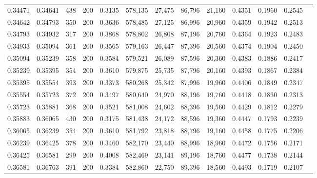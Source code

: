 \begin{tabular}{rrrrrrrrrrrrr}
0.34471 & 0.34641 &   438 & 200 &                                     0.3135 & 578,135 &  27,475 &  86,796 &  21,160 & 0.4351 & 0.1960 & 0.2545 \\
0.34642 & 0.34793 &   350 & 200 &                                     0.3636 & 578,485 &  27,125 &  86,996 &  20,960 & 0.4359 & 0.1942 & 0.2513 \\
0.34793 & 0.34932 &   317 & 200 &                                     0.3868 & 578,802 &  26,808 &  87,196 &  20,760 & 0.4364 & 0.1923 & 0.2483 \\
0.34933 & 0.35094 &   361 & 200 &                                     0.3565 & 579,163 &  26,447 &  87,396 &  20,560 & 0.4374 & 0.1904 & 0.2450 \\
0.35094 & 0.35239 &   358 & 200 &                                     0.3584 & 579,521 &  26,089 &  87,596 &  20,360 & 0.4383 & 0.1886 & 0.2417 \\
0.35239 & 0.35395 &   354 & 200 &                                     0.3610 & 579,875 &  25,735 &  87,796 &  20,160 & 0.4393 & 0.1867 & 0.2384 \\
0.35395 & 0.35554 &   393 & 200 &                                     0.3373 & 580,268 &  25,342 &  87,996 &  19,960 & 0.4406 & 0.1849 & 0.2347 \\
0.35554 & 0.35723 &   372 & 200 &                                     0.3497 & 580,640 &  24,970 &  88,196 &  19,760 & 0.4418 & 0.1830 & 0.2313 \\
0.35723 & 0.35881 &   368 & 200 &                                     0.3521 & 581,008 &  24,602 &  88,396 &  19,560 & 0.4429 & 0.1812 & 0.2279 \\
0.35883 & 0.36065 &   430 & 200 &                                     0.3175 & 581,438 &  24,172 &  88,596 &  19,360 & 0.4447 & 0.1793 & 0.2239 \\
0.36065 & 0.36239 &   354 & 200 &                                     0.3610 & 581,792 &  23,818 &  88,796 &  19,160 & 0.4458 & 0.1775 & 0.2206 \\
0.36239 & 0.36425 &   378 & 200 &                                     0.3460 & 582,170 &  23,440 &  88,996 &  18,960 & 0.4472 & 0.1756 & 0.2171 \\
0.36425 & 0.36581 &   299 & 200 &                                     0.4008 & 582,469 &  23,141 &  89,196 &  18,760 & 0.4477 & 0.1738 & 0.2144 \\
0.36581 & 0.36763 &   391 & 200 &                                     0.3384 & 582,860 &  22,750 &  89,396 &  18,560 & 0.4493 & 0.1719 & 0.2107 \\

\end{tabular}
